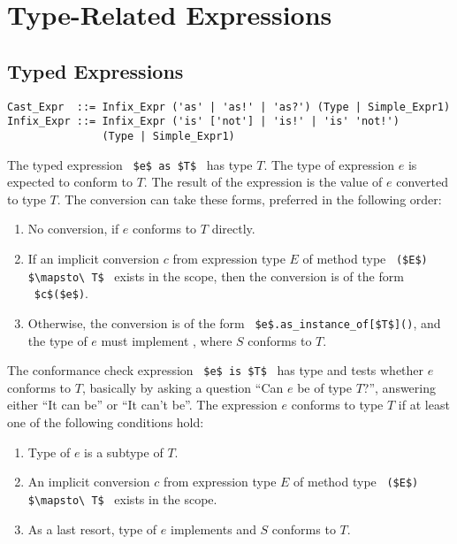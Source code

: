 \section{Type-Related Expressions}





\subsection{Typed Expressions}
\label{sec:typed-expressions}

\syntax\begin{lstlisting}
Cast_Expr  ::= Infix_Expr ('as' | 'as!' | 'as?') (Type | Simple_Expr1)
Infix_Expr ::= Infix_Expr ('is' ['not'] | 'is!' | 'is' 'not!') 
               (Type | Simple_Expr1)
\end{lstlisting}

The typed expression ~\lstinline!$e$ as $T$!~ has type $T$. The type of expression $e$ is expected to conform to $T$. The result of the expression is the value of $e$ converted to type $T$. The conversion can take these forms, preferred in the following order:
\begin{enumerate}
  \item No conversion, if $e$ conforms to $T$ directly. 
  \item If an implicit conversion $c$ from expression type $E$ of method type ~\lstinline!($E$) $\mapsto\ T$!~ exists in the scope, then the conversion is of the form ~\lstinline!$c$($e$)!. 
  \item Otherwise, the conversion is of the form ~\lstinline!$e$.as_instance_of[$T$]()!, and the type of $e$ must implement , where $S$ conforms to $T$.
\end{enumerate}

The conformance check expression ~\lstinline!$e$ is $T$!~ has type  and tests whether $e$ conforms to $T$, basically by asking a question ``Can $e$ be of type $T$?'', answering either ``It can be'' or ``It can't be''. The expression $e$ conforms to type $T$ if at least one of the following conditions hold:
\begin{enumerate}
  \item Type of $e$ is a subtype of $T$. 
  \item An implicit conversion $c$ from expression type $E$ of method type ~\lstinline!($E$) $\mapsto\ T$!~ exists in the scope. 
  \item As a last resort, type of $e$ implements  and $S$ conforms to $T$.
\end{enumerate}

